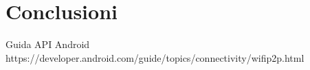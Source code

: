 \documentclass{llncs}
\begin{document}
\section{Conclusioni}



\begin{thebibliography}{}
	 Guida API Android https://developer.android.com/guide/topics/connectivity/wifip2p.html
\end{thebibliography}
\end{document}
